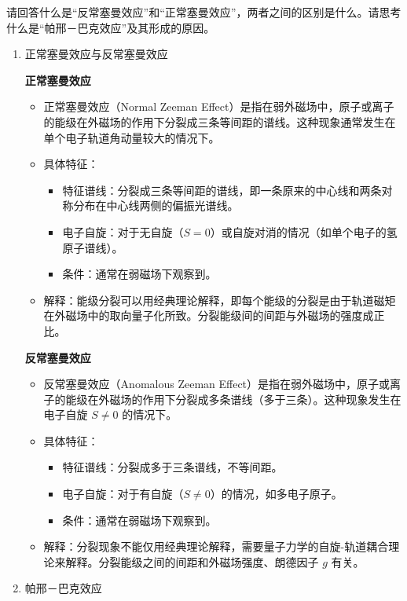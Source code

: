 \documentclass[dvipsnames, svgnames,a4paper,11pt]{article}
\begin{document}
	
	\begin{question}
		请回答什么是“反常塞曼效应”和“正常塞曼效应”，两者之间的区别是什么。请思考什么是“帕邢－巴克效应”及其形成的原因。
	\end{question}
	\begin{enumerate}
		\item 正常塞曼效应与反常塞曼效应
		
		\textbf{正常塞曼效应}
		\begin{itemize}
			\item 正常塞曼效应（Normal Zeeman Effect）是指在弱外磁场中，原子或离子的能级在外磁场的作用下分裂成三条等间距的谱线。这种现象通常发生在单个电子轨道角动量较大的情况下。
			\item 具体特征：
			\begin{itemize}
				\item 特征谱线：分裂成三条等间距的谱线，即一条原来的中心线和两条对称分布在中心线两侧的偏振光谱线。
				\item 电子自旋：对于无自旋（\(S = 0\)）或自旋对消的情况（如单个电子的氢原子谱线）。
				\item 条件：通常在弱磁场下观察到。
			\end{itemize}
			\item 解释：能级分裂可以用经典理论解释，即每个能级的分裂是由于轨道磁矩在外磁场中的取向量子化所致。分裂能级间的间距与外磁场的强度成正比。
		\end{itemize}
		
		\textbf{反常塞曼效应}
		\begin{itemize}
			\item 反常塞曼效应（Anomalous Zeeman Effect）是指在弱外磁场中，原子或离子的能级在外磁场的作用下分裂成多条谱线（多于三条）。这种现象发生在电子自旋 \(S \neq 0\) 的情况下。
			\item 具体特征：
			\begin{itemize}
				\item 特征谱线：分裂成多于三条谱线，不等间距。
				\item 电子自旋：对于有自旋（\(S \neq 0\)）的情况，如多电子原子。
				\item 条件：通常在弱磁场下观察到。
			\end{itemize}
			\item 解释：分裂现象不能仅用经典理论解释，需要量子力学的自旋-轨道耦合理论来解释。分裂能级之间的间距和外磁场强度、朗德因子 \(g\) 有关。
		\end{itemize}
		
		\item 帕邢－巴克效应
		

\end{enumerate}
\end{document}
